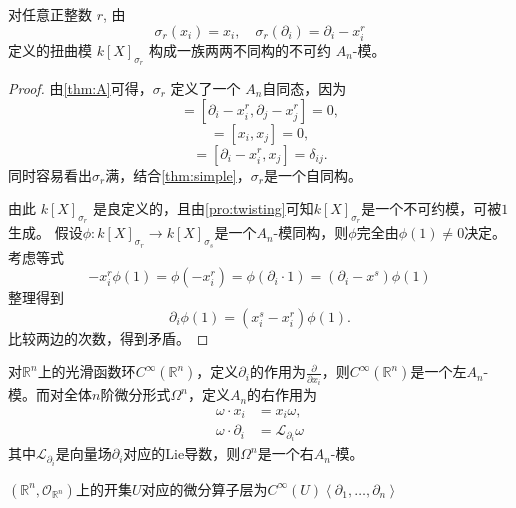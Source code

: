 \begin{theorem}
    对任意正整数 $r$,
    由
    \[
        \sigma_r(x_i)=x_i,\quad \sigma_r(\partial_i)=\partial_i-x_i^r
    \]
    定义的扭曲模 $k[X]_{\sigma_r}$
    构成一族两两不同构的不可约 $A_n$-模。
    \begin{proof}
        由\ref{thm:A}可得，$\sigma_r$ 定义了一个 $A_n$自同态，因为
        \begin{equation*}
            [\sigma_r(\partial_i),\sigma_r(\partial_j)]
            =[\partial_i-x_i^r,\partial_j-x_j^r]
            =0,
        \end{equation*}
        \begin{equation*}
            [\sigma_r(x_i),\sigma_r(x_j)]
            =[x_i,x_j]
            =0,
        \end{equation*}
        \begin{equation*}
            [\sigma_r(\partial_i),\sigma_r(x_j)]
            =[\partial_i-x_i^r,x_j]
            =\delta_{ij}.
        \end{equation*}
        同时容易看出$\sigma_r$满，结合\ref{thm:simple}，$\sigma_r$是一个自同构。

        由此 $k[X]_{\sigma_r}$ 是良定义的，且由\ref{pro:twisting}可知$k[X]_{\sigma_r}$是一个不可约模，可被$1$生成。
        假设$\phi:k[X]_{\sigma_r}\to k[X]_{\sigma_s}$是一个$A_n$-模同构，则$\phi$完全由$\phi(1)\neq 0$决定。考虑等式
        \begin{equation*}
            -x_i^r\phi(1)
            =
            \phi(-x_i^r)
            =
            \phi(\partial_i\cdot 1)
            =
            (\partial_i-x^s)\phi(1)
        \end{equation*}
        整理得到
        \begin{equation*}
            \partial_i\phi(1)=(x_i^s-x_i^r)\phi(1).
        \end{equation*}
        比较两边的次数，得到矛盾。
    \end{proof}

\end{theorem}


\begin{example}
    对$\mathbb{R}^n$上的光滑函数环$C^\infty(\mathbb{R}^n)$，定义$\partial_i$的作用为$\frac{\partial}{\partial x_i}$，则$C^\infty(\mathbb{R}^n)$是一个左$A_n$-模。而对全体$n$阶微分形式$\Omega^n$，定义$A_n$的右作用为
    \begin{equation*}
        \begin{aligned}
            \omega \cdot x_i        & =  x_i \omega,                    \\
            \omega \cdot \partial_i & =  \mathcal{L}_{\partial_i}\omega
        \end{aligned}
    \end{equation*}
    其中$\mathcal{L}_{\partial_i}$是向量场$\partial_i$对应的Lie导数，则$\Omega^n$是一个右$A_n$-模。
\end{example}
\begin{remark}
    $\left(\mathbb{R}^n,\mathcal{O}_{\mathbb{R}^n}\right)$上的开集$U$对应的微分算子层为$C^\infty(U)\left\langle \partial_1,\ldots,\partial_n \right\rangle$
\end{remark}

